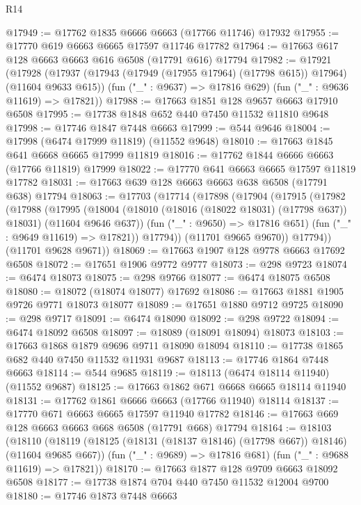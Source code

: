\begin{lexlean}{R14}
\begin{coremodule}
@17949 := @17762 @1835 @6666 @6663 (@17766 @11746) @17932
@17955 := @17770 @619 @6663 @6665 @17597 @11746 @17782
@17964 := @17663 @617 @128 @6663 @6663 @616 @6508 (@17791 @616) @17794
@17982 := @17921
    (@17928
      (@17937 (@17943 (@17949 (@17955 @17964) (@17798 @615)) @17964) (@11604 @9633 @615))
      (fun ("_" : @9637) => @17816 @629)
      (fun ("_" : @9636 @11619) => @17821))
@17988 := @17663 @1851 @128 @9657 @6663 @17910 @6508
@17995 := @17738 @1848 @652 @440 @7450 @11532 @11810 @9648
@17998 := @17746 @1847 @7448 @6663
@17999 := @544 @9646
@18004 := @17998 (@6474 @17999 @11819) (@11552 @9648)
@18010 := @17663 @1845 @641 @6668 @6665 @17999 @11819
@18016 := @17762 @1844 @6666 @6663 (@17766 @11819) @17999
@18022 := @17770 @641 @6663 @6665 @17597 @11819 @17782
@18031 := @17663 @639 @128 @6663 @6663 @638 @6508 (@17791 @638) @17794
@18063 := @17703
    (@17714
      (@17898
        (@17904
          (@17915
            (@17982
              (@17988
                (@17995
                  (@18004
                    (@18010 (@18016 (@18022 @18031) (@17798 @637)) @18031)
                    (@11604 @9646 @637))
                  (fun ("_" : @9650) => @17816 @651)
                  (fun ("_" : @9649 @11619) => @17821))
                @17794))
            (@11701 @9665 @9670))
          @17794))
      (@11701 @9628 @9671))
@18069 := @17663 @1907 @128 @9778 @6663 @17692 @6508
@18072 := @17651 @1906 @9772 @9777
@18073 := @298 @9723
@18074 := @6474 @18073
@18075 := @298 @9766
@18077 := @6474 @18075 @6508
@18080 := @18072 (@18074 @18077) @17692
@18086 := @17663 @1881 @1905 @9726 @9771 @18073 @18077
@18089 := @17651 @1880 @9712 @9725
@18090 := @298 @9717
@18091 := @6474 @18090
@18092 := @298 @9722
@18094 := @6474 @18092 @6508
@18097 := @18089 (@18091 @18094) @18073
@18103 := @17663 @1868 @1879 @9696 @9711 @18090 @18094
@18110 := @17738 @1865 @682 @440 @7450 @11532 @11931 @9687
@18113 := @17746 @1864 @7448 @6663
@18114 := @544 @9685
@18119 := @18113 (@6474 @18114 @11940) (@11552 @9687)
@18125 := @17663 @1862 @671 @6668 @6665 @18114 @11940
@18131 := @17762 @1861 @6666 @6663 (@17766 @11940) @18114
@18137 := @17770 @671 @6663 @6665 @17597 @11940 @17782
@18146 := @17663 @669 @128 @6663 @6663 @668 @6508 (@17791 @668) @17794
@18164 := @18103
    (@18110
      (@18119 (@18125 (@18131 (@18137 @18146) (@17798 @667)) @18146) (@11604 @9685 @667))
      (fun ("_" : @9689) => @17816 @681)
      (fun ("_" : @9688 @11619) => @17821))
@18170 := @17663 @1877 @128 @9709 @6663 @18092 @6508
@18177 := @17738 @1874 @704 @440 @7450 @11532 @12004 @9700
@18180 := @17746 @1873 @7448 @6663

\end{coremodule}
\end{lexlean}
